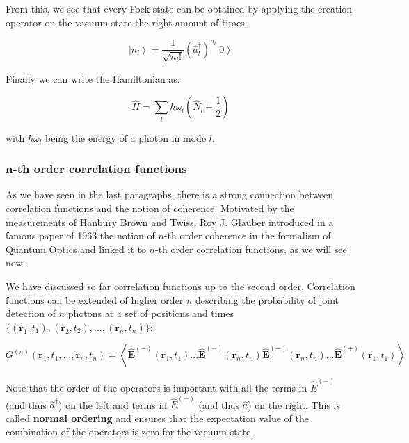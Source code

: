 \noindent From this, we see that every Fock state can be obtained by applying the creation operator on the vacuum state the right amount of times:

\begin{equation}
    \left|n_{l}\right\rangle=\frac{1}{\sqrt{n_{l} !}}\left(\hat{a}_{l}^{\dagger}\right)^{n_{l}}\left|0\right\rangle
\end{equation}


\noindent Finally we can write the Hamiltonian as:

\begin{equation}
    \hat{H}=\sum_{l} \hbar \omega_{l}\left(\hat{N}_{l}+\frac{1}{2}\right)
\end{equation}

\noindent with $\hbar \omega_l$ being the energy of a photon in mode $l$.

\subsubsection{n-th order correlation functions}

As we have seen in the last paragraphs, there is a strong connection between correlation functions and the notion of coherence. Motivated by the measurements of Hanbury Brown and Twiss, Roy J. Glauber introduced in a famous paper of 1963 \cite{glauber1963quantum} the notion of $n$-th order coherence in the formalism of Quantum Optics and linked it to $n$-th order correlation functions, as we will see now.

We have discussed so far correlation functions up to the second order. Correlation functions can be extended of higher order $n$ describing the probability of joint detection of $n$ photons at a set of positions and times $\{(\bm{r}_1,t_1),(\bm{r}_2,t_2),...,(\bm{r}_n,t_n)\}$: 

\begin{equation}
    G^{(n)}\left(\bm{r}_{1}, t_{1}, ... , \bm{r}_{n}, t_{n}\right)=\left\langle \hat{\bm{E}}^{(-)}\left(\bm{r}_{1}, t_{1}\right) ... \hat{\bm{E}}^{(-)}\left(\bm{r}_{n}, t_{n}\right) \hat{\bm{E}}^{(+)}\left(\bm{r}_{n}, t_{n}\right) ... \hat{\bm{E}}^{(+)}\left(\bm{r}_{1}, t_{1}\right)\right\rangle
\end{equation}

\label{sec:normal_order}
\noindent Note that the order of the operators is important with all the terms in $\hat{E}^{(-)}$ (and thus $\hat{a}^{\dagger}$) on the left and terms in $\hat{E}^{(+)}$ (and thus $\hat{a}$) on the right. This is called \textbf{normal ordering} and ensures that the expectation value of the combination of the operators is zero for the vacuum state. 

